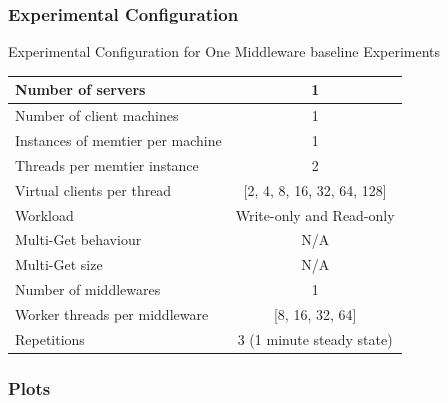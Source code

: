 \documentclass[11pt,a4paper]{article}
\begin{document}
\subsubsection{Experimental Configuration}
\begin{center}
	\scriptsize{
		Experimental Configuration for One Middleware baseline Experiments
		\begin{tabular}{|l|c|}
			\hline Number of servers                & 1                          \\ 
			\hline Number of client machines        & 1                          \\ 
			\hline Instances of memtier per machine & 1                          \\ 
			\hline Threads per memtier instance     & 2                          \\
			\hline Virtual clients per thread       & [2, 4, 8, 16, 32, 64, 128] \\ 
			\hline Workload                         & Write-only and Read-only   \\
			\hline Multi-Get behaviour               & N/A                        \\
			\hline Multi-Get size                   & N/A                        \\
			\hline Number of middlewares            & 1                          \\
			\hline Worker threads per middleware    & [8, 16, 32, 64]            \\
			\hline Repetitions                      & 3 (1 minute steady state)  \\ 
			\hline 
		\end{tabular}
	} 
\end{center}

\subsubsection{Plots}
\end{document}
